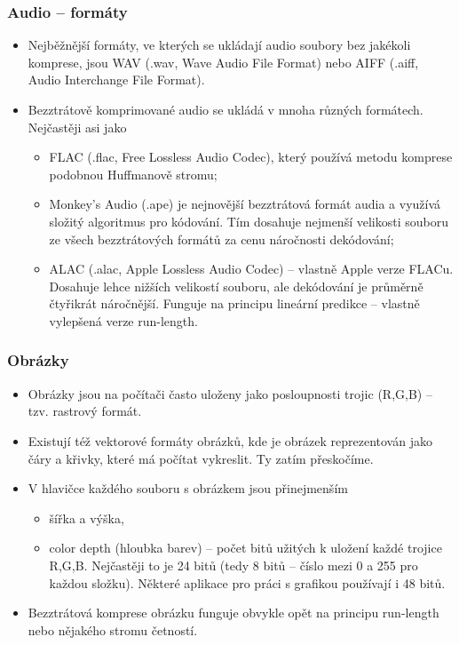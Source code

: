 \documentclass[aspectratio=169,11pt,svgnames,handout]{beamer}
\begin{document}
\begin{frame}
 \frametitle{Audio -- formáty}
 \vspace*{-1em}
 \begin{itemize}[label=\textbullet]
  \item Nejběžnější formáty, ve kterých se ukládají audio soubory \alert{bez
   jakékoli komprese}, jsou \alert{WAV} (.wav, Wave Audio File Format) nebo
   \alert{AIFF} (.aiff, Audio Interchange File Format).
  \item Bezztrátově komprimované audio se ukládá v mnoha různých formátech.
   Nejčastěji asi jako
   \begin{itemize}[label=\textemdash]
    \item \alert{FLAC} (.flac, Free Lossless Audio Codec), který používá metodu
     komprese podobnou Huffmanově stromu;
    \pause
    \item \alert{Monkey's Audio} (.ape) je nejnovější bezztrátová formát audia a
     využívá složitý algoritmus pro kódování. Tím dosahuje nejmenší velikosti
     souboru ze všech bezztrátových formátů za cenu náročnosti dekódování;
    \pause
    \item \alert{ALAC} (.alac, Apple Lossless Audio Codec) -- vlastně Apple
     verze FLACu. Dosahuje lehce nižších velikostí souboru, ale dekódování je
     průměrně čtyřikrát náročnější. Funguje na principu lineární predikce --
     vlastně vylepšená verze run-length.
   \end{itemize}
 \end{itemize}
\end{frame}

\begin{frame}
 \frametitle{Obrázky}
 \begin{itemize}[label=\textbullet]
  \item Obrázky jsou na počítači často uloženy jako posloupnosti trojic
   (R,G,B) -- tzv. \alert{rastrový formát}.\pause
  \item Existují též \alert{vektorové formáty} obrázků, kde je obrázek
   reprezentován jako čáry a křivky, které má počítat vykreslit. Ty zatím
   přeskočíme.
  \pause
  \item V hlavičce každého souboru s obrázkem jsou přinejmenším
  \begin{itemize}[label=\textemdash]
   \item šířka a výška,
   \pause
   \item \alert{color depth} (hloubka barev) -- počet bitů užitých k uložení
    každé trojice R,G,B. Nejčastěji to je 24 bitů (tedy 8 bitů -- číslo mezi 0 a
    255 pro každou složku). Některé aplikace pro práci s grafikou používají i 48
    bitů.
  \end{itemize}
  \pause
  \item Bezztrátová komprese obrázku funguje obvykle opět na principu run-length
   nebo nějakého stromu četností.
 \end{itemize}
\end{frame}
\end{document}
